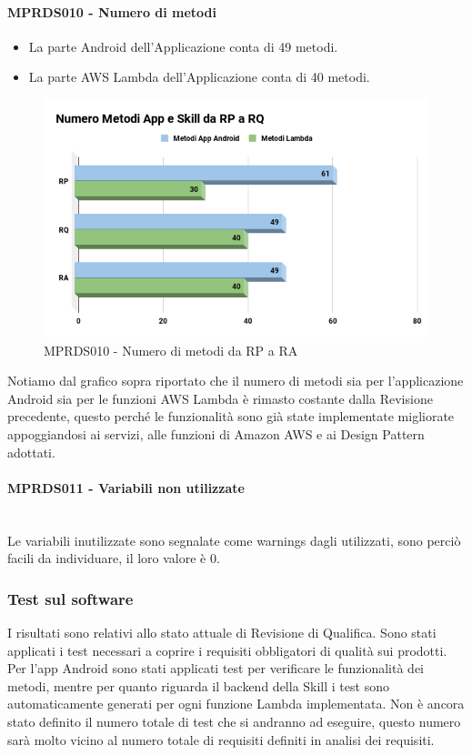 \paragraph{MPRDS010 - Numero di metodi}
\begin{itemize}
	\item La parte Android dell'Applicazione conta di 49 metodi.
	\item La parte AWS Lambda dell'Applicazione conta di 40 metodi.
\end{itemize}
\begin{figure}[H]
	\centering
	\includegraphics[width=13cm,keepaspectratio]{../includes/pics/nMetodiRA.png}
	\caption{\label{fig:mission}MPRDS010 -  Numero di metodi da RP a RA}
\end{figure}
Notiamo dal grafico sopra riportato che il numero di metodi sia per l'applicazione Android sia per le funzioni AWS Lambda è rimasto costante dalla Revisione precedente, questo perché le funzionalità sono già state implementate migliorate appoggiandosi ai servizi, alle funzioni di Amazon AWS e ai Design Pattern adottati.
\paragraph{MPRDS011 - Variabili non utilizzate}\mbox{}\\[0.4cm]
Le variabili inutilizzate sono segnalate come warnings dagli  utilizzati, sono perciò facili da individuare, il loro valore è 0.
\subsubsection{Test sul software}
I risultati sono relativi allo stato attuale di Revisione di Qualifica. Sono stati applicati i test necessari a coprire i requisiti obbligatori di qualità sui prodotti. Per l'app Android sono stati applicati test per verificare le funzionalità dei metodi, mentre per quanto riguarda il backend della Skill i test sono automaticamente generati per ogni funzione Lambda implementata. Non è ancora stato definito il numero totale di test che si andranno ad eseguire, questo numero sarà molto vicino al numero totale di requisiti definiti in analisi dei requisiti.
\pagebreak
